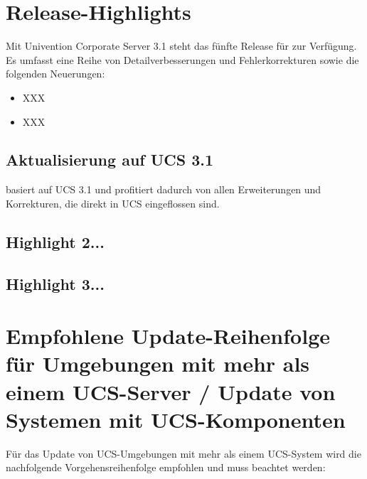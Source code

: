 


\newcommand{\ucsManualTitle}{UCS@school 3.1 R2 Release Notes}
\newcommand{\ucsManualSubtitle}{Release Notes für die Inbetriebnahme und
Aktualisierung von \ucsUAS{} 3.1 R2}
\newcommand{\ucsManualVersion}{3.1}
\newcommand{\ucsTechAuthor}{ & Univention GmbH & feedback@univention.de}
\newcommand{\ucsSVNVersion}{16319}

\setcounter{secnumdepth}{3}
\setcounter{tocdepth}{3}



\chapter{Release-Highlights}

Mit Univention Corporate Server 3.1 steht das fünfte Release für
\ucsUAS{} zur Verfügung. Es umfasst eine Reihe von Detailverbesserungen und Fehlerkorrekturen sowie die
folgenden Neuerungen:
\begin{itemize}
\item XXX
\item XXX
\end{itemize}


\section{Aktualisierung auf UCS 3.1}
\ucsUAS{} basiert auf UCS 3.1 und profitiert dadurch von allen Erweiterungen und Korrekturen, die direkt
in UCS eingeflossen sind.

\section{Highlight 2...}
\section{Highlight 3...}

\chapter{Empfohlene Update-Reihenfolge für Umgebungen mit mehr als einem UCS-Server / Update von Systemen mit UCS-Komponenten}

Für das Update von UCS-Umgebungen mit mehr als einem UCS-System wird
die nachfolgende Vorgehensreihenfolge empfohlen und muss beachtet werden:


